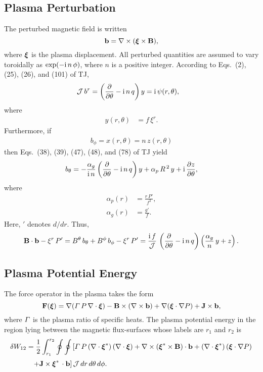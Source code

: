 \documentclass[12pt,prb,aps,notitlepage]{revtex4-1}
\newcommand{\bxi}{\mbox{\boldmath$\xi$}}
\begin{document}
\subsection{Plasma Perturbation}
The perturbed magnetic field is written 
\begin{equation}
{\bf b} = \nabla\times (\bxi\times{\bf B}),
\end{equation}
where $\bxi$ is the plasma displacement. All perturbed quantities are assumed to vary toroidally as $\exp(-{\rm i}\,n\,\phi)$,
where $n$ is a positive integer. According to Eqs.~(2), (25), (26), and
(101) of TJ, 
\begin{align}\label{e9}
{\cal J}\,b^r&=\left(\frac{\partial}{\partial\theta}-{\rm i}\,n\,q\right)y = {\rm i}\,\psi(r,\theta),
\end{align}
where
\begin{align}\label{e10}
y(r,\theta)&= f\,\xi^r.
\end{align}
Furthermore, if
\begin{align}
b_\phi = x(r,\theta)= n\,z(r,\theta)
\end{align}
then Eqs.~(38), (39), (47), (48), and (78) of TJ yield
\begin{align}
b_\theta = -\frac{\alpha_g}{{\rm i}\,n}\left(\frac{\partial}{\partial\theta} - {\rm i}\,n\,q\right)y +\alpha_p\,R^{\,2}\,y +{\rm i}\,\frac{\partial z}{\partial\theta},
\end{align}
where
\begin{align}
\alpha_p(r) &= \frac{r\,P'}{f^2},\label{ap}\\[0.5ex]
\alpha_g (r)&= \frac{g'}{f}.\label{ag}
\end{align}
Here, $'$ denotes $d/dr$. 
Thus,
\begin{equation}\label{e15}
{\bf B}\cdot{\bf b} -\xi^r\,P' = B^\theta\,b_\theta+B^\phi\,b_\phi - \xi^r\,P'=
\frac{{\rm i}\,f}{\cal J}\,\left(\frac{\partial}{\partial\theta}- {\rm i}\,n\,q\right)\left(\frac{\alpha_g}{n}\,y+z\right).
\end{equation}

\subsection{Plasma Potential Energy}
The force operator in the plasma takes the form 
\begin{equation}
{\bf F}(\bxi)= \nabla({\mit\Gamma}\,P\,\nabla\cdot\bxi) - {\bf B}\times(\nabla\times {\bf b})+\nabla(\bxi\cdot\nabla P)+{\bf J}\times  {\bf b},
\end{equation}
where ${\mit\Gamma}$ is the plasma ratio of specific heats. 
The plasma potential energy in the region lying between the magnetic  flux-surfaces whose labels are $r_1$ and $r_2$ is 
\begin{align}
\delta W_{12} &= \frac{1}{2}\int_{r_1}^{r_2}\oint\oint\left[{\mit\Gamma}\,P\,(\nabla\cdot\bxi^\ast)\,(\nabla\cdot\bxi)+ \nabla\times (\bxi^\ast\times {\bf B})\cdot {\bf b}
+(\nabla\cdot\bxi^\ast)\,(\bxi\cdot\nabla P)\right.\nonumber\\[0.5ex]&\phantom{=}
\left.+{\bf J}\times \bxi^\ast\,\cdot{\bf b}\right]{\cal J}\,dr\,d\theta\,d\phi.
\end{align}
\end{document}
